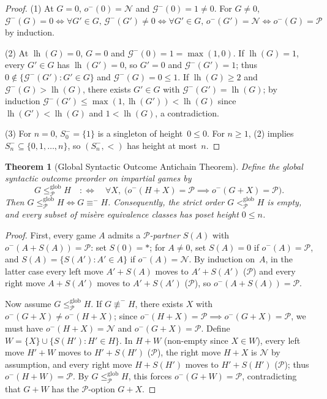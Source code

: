 \documentclass[11pt]{amsart}
\newtheorem{theorem}{Theorem}[section]
\theoremstyle{definition}
\theoremstyle{remark}
\newcommand{\Npos}{\mathcal{N}}
\newcommand{\Ppos}{\mathcal{P}}
\newcommand{\Glayer}{\mathcal{G}}
\DeclareMathOperator{\lh}{lh}
\begin{document}
\begin{proof}
(1) At $G = 0$, $o^-(0) = \Npos$ and $\Glayer^-(0) = 1 \neq 0$. For $G \neq 0$, $\Glayer^-(G) = 0 \iff \forall G' \in G,\, \Glayer^-(G') \neq 0 \iff \forall G' \in G,\, o^-(G') = \Npos \iff o^-(G) = \Ppos$ by induction.

(2) At $\lh(G) = 0$, $G = 0$ and $\Glayer^-(0) = 1 = \max(1, 0)$. If $\lh(G) = 1$, every $G' \in G$ has $\lh(G') = 0$, so $G' = 0$ and $\Glayer^-(G') = 1$; thus $0 \notin \{\Glayer^-(G') : G' \in G\}$ and $\Glayer^-(G) = 0 \le 1$. If $\lh(G) \ge 2$ and $\Glayer^-(G) > \lh(G)$, there exists $G' \in G$ with $\Glayer^-(G') = \lh(G)$; by induction $\Glayer^-(G') \le \max(1, \lh(G')) < \lh(G)$ since $\lh(G') < \lh(G)$ and $1 < \lh(G)$, a contradiction.

(3) For $n = 0$, $S_0^- = \{1\}$ is a singleton of height~$0 \le 0$. For $n \ge 1$, (2) implies $S_n^- \subseteq \{0, 1, \dots, n\}$, so $(S_n^-, <)$ has height at most~$n$.
\end{proof}

\begin{theorem}[Global Syntactic Outcome Antichain Theorem]
\label{thm:antichain}
Define the global syntactic outcome preorder on impartial games by
\[
  G \le_{\Ppos}^{\mathrm{glob}} H \quad :\Longleftrightarrow \quad \forall X,\;\bigl(o^-(H + X) = \Ppos \implies o^-(G + X) = \Ppos\bigr).
\]
Then $G \le_{\Ppos}^{\mathrm{glob}} H \iff G \equiv^- H$. Consequently, the strict order $G <_{\Ppos}^{\mathrm{glob}} H$ is empty, and every subset of mis\`ere equivalence classes has poset height $0 \le n$.
\end{theorem}

\begin{proof}
First, every game $A$ admits a \emph{$\Ppos$-partner} $S(A)$ with $o^-(A + S(A)) = \Ppos$: set $S(0) = *$; for $A \neq 0$, set $S(A) = 0$ if $o^-(A) = \Ppos$, and $S(A) = \{S(A') : A' \in A\}$ if $o^-(A) = \Npos$. By induction on~$A$, in the latter case every left move $A' + S(A)$ moves to $A' + S(A')$ ($\Ppos$) and every right move $A + S(A')$ moves to $A' + S(A')$ ($\Ppos$), so $o^-(A + S(A)) = \Ppos$.

Now assume $G \le_{\Ppos}^{\mathrm{glob}} H$. If $G \not\equiv^- H$, there exists $X$ with $o^-(G + X) \neq o^-(H + X)$; since $o^-(H + X) = \Ppos \implies o^-(G + X) = \Ppos$, we must have $o^-(H + X) = \Npos$ and $o^-(G + X) = \Ppos$. Define $W = \{X\} \cup \{S(H') : H' \in H\}$. In $H + W$ (non-empty since $X \in W$), every left move $H' + W$ moves to $H' + S(H')$ ($\Ppos$), the right move $H + X$ is $\Npos$ by assumption, and every right move $H + S(H')$ moves to $H' + S(H')$ ($\Ppos$); thus $o^-(H + W) = \Ppos$. By $G \le_{\Ppos}^{\mathrm{glob}} H$, this forces $o^-(G + W) = \Ppos$, contradicting that $G + W$ has the $\Ppos$-option $G + X$.
\end{proof}
\end{document}
